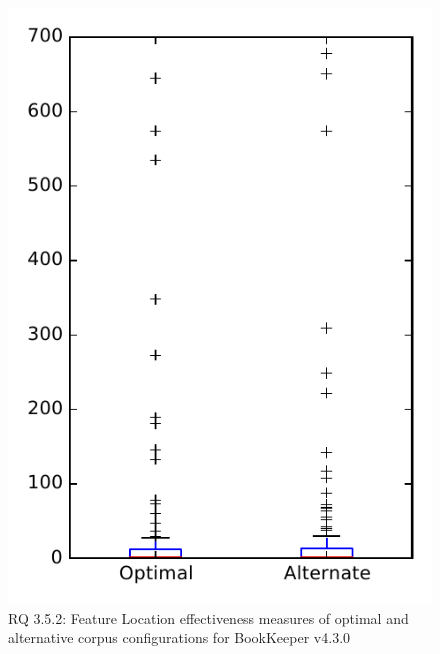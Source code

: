 
\begin{figure}
\centering
\includegraphics[height=0.4\textheight]{figures/combo/flt_rq2_bookkeeper}
\caption{RQ 3.5.2: Feature Location effectiveness measures of optimal and alternative corpus configurations for BookKeeper v4.3.0}
\label{fig:combo:flt:rq2:bookkeeper}
\end{figure}
